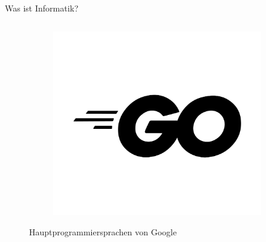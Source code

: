 \begin{frame}{Was ist Informatik?}
\begin{columns}
\begin{column}{0.4\textwidth}
\begin{figure}
             \begin{subfigure}{0.475\textwidth}
                \centering
                \includegraphics[width=\textwidth,height=0.15\textheight,keepaspectratio]{chapters/02_computer_science/figures/google/programming/languages/go.png}
            \end{subfigure}
            
            \caption{Hauptprogrammiersprachen von Google}
            \end{figure}
        \end{column}
    \end{columns}
    \end{frame}
    
